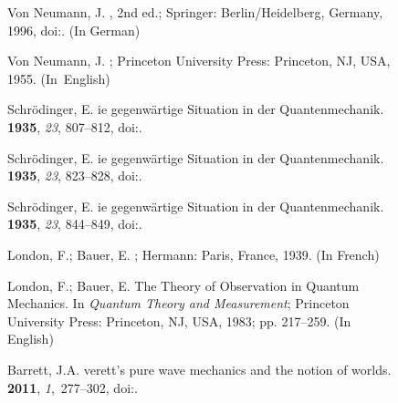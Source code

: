 \documentclass[entropy,article,accept,oneauthor,pdftex]{Definitions/mdpi}
\begin{document}
\begin{figure}[H]
\begin{thebibliography}{999}
{Von Neumann}, J.
, 2nd ed.; Springer: Berlin/Heidelberg, Germany, 1996, doi:{\href{https://doi.org/10.1007/978-3-642-61409-5}{}}. (In German)

{Von Neumann}, J.
; Princeton University Press: Princeton, NJ, USA, 1955. (In~English)

Schr{\"{o}}dinger, E.
ie gegenw\"artige {S}ituation in der {Q}uantenmechanik.
 {\bf 1935}, {\em 23}, 807--812, doi:{\href{https://doi.org/10.1007/BF01491891}{}}.

Schr{\"{o}}dinger, E.
ie gegenw\"artige {S}ituation in der {Q}uantenmechanik.
 {\bf 1935}, {\em 23}, 823--828, doi:{\href{https://doi.org/10.1007/BF01491914}{}}.

Schr{\"{o}}dinger, E.
ie gegenw\"artige {S}ituation in der {Q}uantenmechanik.
 {\bf 1935}, {\em 23}, 844--849, doi:{\href{https://doi.org/10.1007/BF01491987}{}}.

London, F.; Bauer, E.
; Hermann: Paris, France, 1939. (In French)

London, F.; Bauer, E.
\newblock The Theory of Observation in Quantum Mechanics. In {\em Quantum Theory and Measurement}; Princeton University Press: Princeton, NJ, USA, 1983; pp. 217--259. (In English)

Barrett, J.A.
verett's pure wave mechanics and the notion of worlds.
 {\bf 2011}, {\em 1},~277--302, doi:{\href{https://doi.org/10.1007/s13194-011-0023-9}{}}.


\end{thebibliography}
\end{figure}
\end{document}
